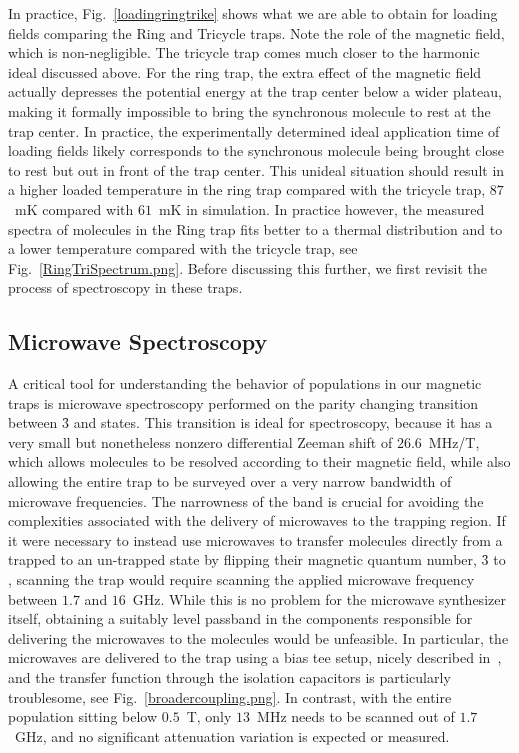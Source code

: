 In practice, Fig.~\ref{loadingringtrike} shows what we are able to obtain for loading fields comparing the Ring and Tricycle traps.
Note the role of the magnetic field, which is non-negligible.
The tricycle trap comes much closer to the harmonic ideal discussed above.
For the ring trap, the extra effect of the magnetic field actually depresses the potential energy at the trap center below a wider plateau, making it formally impossible to bring the synchronous molecule to rest at the trap center.
In practice, the experimentally determined ideal application time of loading fields likely corresponds to the synchronous molecule being brought close to rest but out in front of the trap center.
This unideal situation should result in a higher loaded temperature in the ring trap compared with the tricycle trap, $87$~mK compared with $61$~mK in simulation.
In practice however, the measured spectra of molecules in the Ring trap fits better to a thermal distribution and to a lower temperature compared with the tricycle trap, see Fig.~\ref{RingTriSpectrum.png}.
Before discussing this further, we first revisit the process of spectroscopy in these traps.

\subsection{Microwave Spectroscopy}

A critical tool for understanding the behavior of populations in our magnetic traps is microwave spectroscopy performed on the parity changing transition between \f3 and  states.
This transition is ideal for spectroscopy, because it has a very small but nonetheless nonzero differential Zeeman shift of $26.6$~MHz/T, which allows molecules to be resolved according to their magnetic field, while also allowing the entire trap to be surveyed over a very narrow bandwidth of microwave frequencies.
The narrowness of the band is crucial for avoiding the complexities associated with the delivery of microwaves to the trapping region.
If it were necessary to instead use microwaves to transfer molecules directly from a trapped to an un-trapped state by flipping their magnetic quantum number, \f3 to , scanning the trap would require scanning the applied microwave frequency between $1.7$ and $16$~GHz.
While this is no problem for the microwave synthesizer itself, obtaining a suitably level passband in the components responsible for delivering the microwaves to the molecules would be unfeasible.
In particular, the microwaves are delivered to the trap using a bias tee setup, nicely described in~\citep[Fig.~5]{Stuhl2012uwave}, and the transfer function through the isolation capacitors is particularly troublesome, see Fig.~\ref{broadercoupling.png}.
In contrast, with the entire population sitting below $0.5$~T, only $13$~MHz needs to be scanned out of $1.7$~GHz, and no significant attenuation variation is expected or measured.

